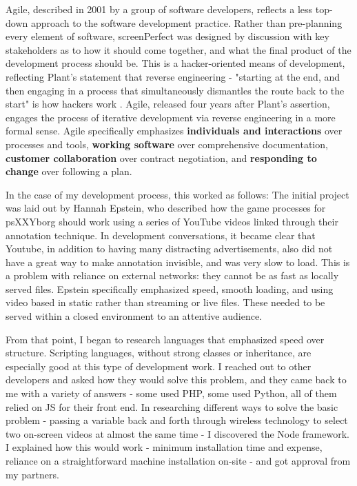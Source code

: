 Agile, described in 2001 by a group of software developers, reflects a less top-down approach to the software development practice. Rather than pre-planning every element of software, screenPerfect was designed by discussion with key stakeholders as to how it should come together, and what the final product of the development process should be. This is a hacker-oriented means of development, reflecting Plant's statement that reverse engineering - "starting at the end, and then engaging in a process that simultaneously dismantles the route back to the start" is how hackers work \parencite{plant}. Agile, released four years after Plant's assertion, engages the process of iterative development via reverse engineering in a more formal sense. Agile specifically emphasizes \textbf{individuals and interactions} over processes and tools, \textbf{working software} over comprehensive documentation, \textbf{customer collaboration} over contract negotiation, and \textbf{responding to change} over following a plan. 

In the case of my development process, this worked as follows: The initial project was laid out by Hannah Epstein, who described how the game processes for psXXYborg should work using a series of YouTube videos linked through their annotation technique. In development conversations, it became clear that Youtube, in addition to having many distracting advertisements, also did not have a great way to make annotation invisible, and was very slow to load. This is a problem with reliance on external networks: they cannot be as fast as locally served files. Epstein specifically emphasized speed, smooth loading, and using video based in static rather than streaming or live files. These needed to be served within a closed environment to an attentive audience.

From that point, I began to research languages that emphasized speed over structure. Scripting languages, without strong classes or inheritance, are especially good at this type of development work. I reached out to other developers and asked how they would solve this problem, and they came back to me with a variety of answers - some used PHP, some used Python, all of them relied on JS for their front end. In researching different ways to solve the basic problem - passing a variable back and forth through wireless technology to select two on-screen videos at almost the same time - I discovered the Node framework. I explained how this would work - minimum installation time and expense, reliance on a straightforward machine installation on-site - and got approval from my partners.

